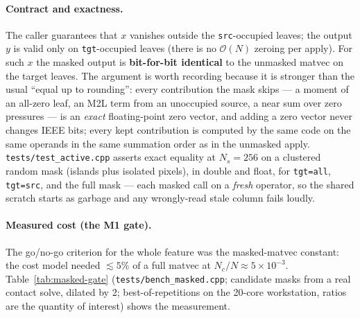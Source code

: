 \documentclass[11pt,a4paper]{article}
\newcommand{\Order}{\mathcal{O}}
\newcommand{\code}[1]{\texttt{#1}}
\theoremstyle{definition}
\theoremstyle{remark}
\begin{document}
\paragraph{Contract and exactness.} The caller guarantees that $x$ vanishes
outside the \code{src}-occupied leaves; the output $y$ is valid only on
\code{tgt}-occupied leaves (there is no $\Order(N)$ zeroing per apply). For
such $x$ the masked output is \textbf{bit-for-bit identical} to the unmasked
matvec on the target leaves. The argument is worth recording because it is
stronger than the usual ``equal up to rounding'': every contribution the
mask skips --- a moment of an all-zero leaf, an M2L term from an unoccupied
source, a near sum over zero pressures --- is an \emph{exact} floating-point
zero vector, and adding a zero vector never changes IEEE bits; every kept
contribution is computed by the same code on the same operands in the same
summation order as in the unmasked apply. \code{tests/test\_active.cpp}
asserts exact equality at $N_s=256$ on a clustered random mask (islands plus
isolated pixels), in double and float, for \code{tgt=all}, \code{tgt=src},
and the full mask --- each masked call on a \emph{fresh} operator, so the
shared scratch starts as garbage and any wrongly-read stale column fails
loudly.

\paragraph{Measured cost (the M1 gate).} The go/no-go criterion for the
whole feature was the masked-matvec constant: the cost model needed
${\lesssim}5\%$ of a full matvec at $N_c/N\approx5\times10^{-3}$.
Table~\ref{tab:masked-gate} (\code{tests/bench\_masked.cpp}; candidate masks
from a real contact solve, dilated by 2; best-of-repetitions on the 20-core
workstation, ratios are the quantity of interest) shows the measurement.
\end{document}
